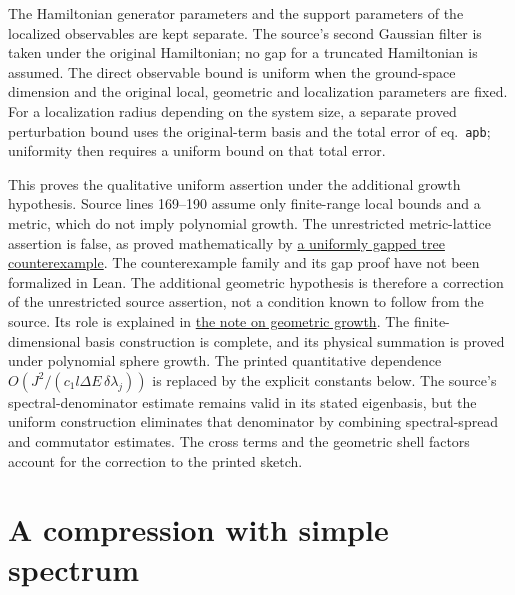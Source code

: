 \documentclass{article}
\begin{document}
The Hamiltonian generator parameters and the support parameters of the localized
observables are kept separate. The source's second Gaussian filter is taken
under the original Hamiltonian; no gap for a truncated Hamiltonian is assumed.
The direct observable bound is uniform when the ground-space dimension and
the original local, geometric and localization parameters are fixed. For a
localization radius depending on the system size, a separate proved perturbation
bound uses the original-term basis and the total error of eq.~\texttt{apb};
uniformity then requires a uniform bound on that total error.

This proves the qualitative uniform assertion under the additional growth
hypothesis. Source lines 169--190 assume only finite-range local bounds and a
metric, which do not imply polynomial growth. The unrestricted metric-lattice
assertion is false, as proved mathematically by
\href{https://sirui-lu.com/TNLean/paper-gaps/hastings05_tree_basis_counterexample.pdf}
{a uniformly gapped tree counterexample}. The counterexample family and
its gap proof have not been formalized in Lean. The additional geometric
hypothesis is therefore a correction of the unrestricted source assertion,
not a condition known to follow from the source. Its role is explained in
\href{https://sirui-lu.com/TNLean/paper-gaps/hastings05_geometric_growth_scope.pdf}
{the note on geometric growth}. The finite-dimensional basis construction is
complete, and its physical summation is proved under polynomial sphere growth.
The printed quantitative
dependence $O(J^2/(c_1l\Delta E\,\delta\lambda_j))$ is replaced by the explicit
constants below. The source's spectral-denominator estimate remains valid in
its stated eigenbasis, but the uniform construction eliminates that denominator
by combining spectral-spread and commutator estimates. The cross terms and the
geometric shell factors account for the correction to the printed sketch.

\section{A compression with simple spectrum}
\end{document}
